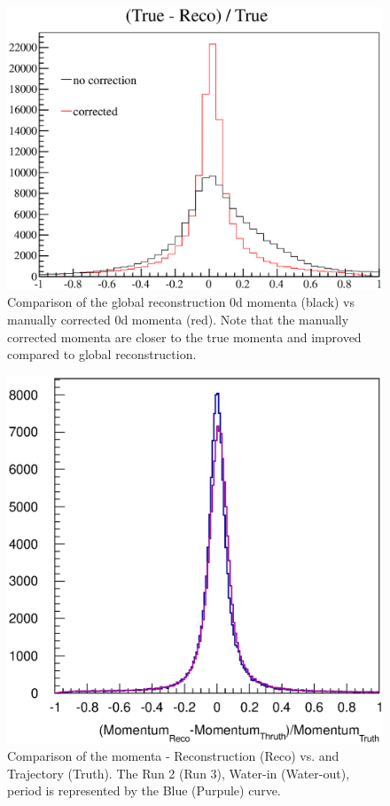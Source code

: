 \begin{figure}
\centering
\includegraphics[width=5.5in]{Figures/eCompare.eps}
\caption{Comparison of the global reconstruction \p0d momenta (black) vs manually corrected \p0d momenta (red).  Note that 
the manually corrected momenta are closer to the true momenta and improved compared to global reconstruction.} 
\label{fig:correctedECompare}
\end{figure}

\begin{figure}
\centering
\includegraphics[width=5.5in]{Figures/momentumRecoThruthProd5.eps}
\caption{Comparison of the momenta - Reconstruction (Reco) vs. 
and Trajectory (Truth). The Run 2 (Run 3), Water-in (Water-out), 
period is represented by the Blue (Purpule) curve.}
\label{fig:MomentumComparison}
\end{figure}
